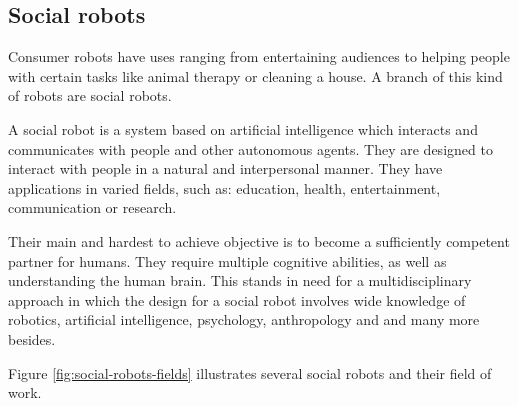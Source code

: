 \documentclass[runningheads,a4paper,12pt]{report}
\begin{document}
\subsection{Social robots}
Consumer robots have uses ranging from entertaining audiences to helping people with certain tasks like animal therapy or cleaning a house. A branch of this kind of robots are social robots. 

A social robot is a system based on artificial intelligence which interacts and communicates with people and other autonomous agents. They are designed to interact with people in a natural and interpersonal manner. They have applications in varied fields, such as: education, health, entertainment, communication or research.

Their main and hardest to achieve objective is to become a sufficiently competent partner for humans. They require multiple cognitive abilities, as well as understanding the human brain. This stands in need for a multidisciplinary approach in which the design for a social robot involves wide knowledge of robotics, artificial intelligence, psychology, anthropology and and many more besides. 

Figure \ref{fig:social-robots-fields} illustrates several social robots and their field of work. 
\end{document}
